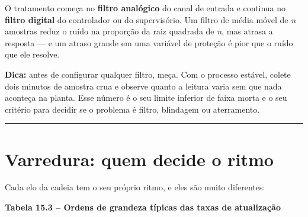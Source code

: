 O tratamento começa no \textbf{filtro analógico} do canal de entrada e continua no \textbf{filtro digital} do
controlador ou do supervisório. Um filtro de média móvel de \emph{n} amostras reduz o ruído na proporção
da raiz quadrada de \emph{n}, mas atrasa a resposta --- e um atraso grande em uma variável de proteção é
pior que o ruído que ele resolve.

\begin{caixadica}

\textbf{Dica:} antes de configurar qualquer filtro, meça. Com o processo estável, colete dois minutos
de amostra crua e observe quanto a leitura varia sem que nada aconteça na planta. Esse número é o
seu limite inferior de faixa morta e o seu critério para decidir se o problema é filtro, blindagem
ou aterramento.

\end{caixadica}

\begin{center}\rule{0.5\linewidth}{0.5pt}\end{center}

\section{Varredura: quem decide o ritmo}\label{varredura-quem-decide-o-ritmo}

Cada elo da cadeia tem o seu próprio ritmo, e eles são muito diferentes:

\textbf{Tabela 15.3 -- Ordens de grandeza típicas das taxas de atualização}

